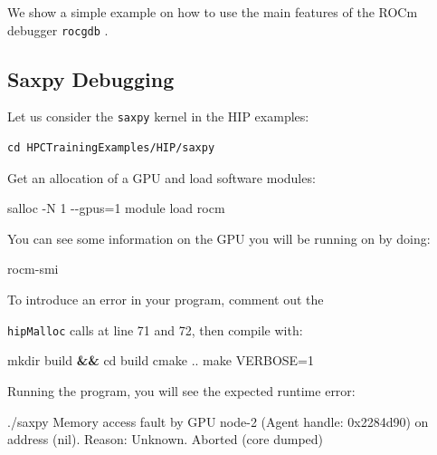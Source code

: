 \documentclass[
]{article}
\let\oldtexttt\texttt
\renewcommand{\texttt}[1]{
  \colorbox{Light}{\oldtexttt{#1}}
}
\newenvironment{Shaded}{}{}
\newcommand{\BuiltInTok}[1]{#1}
\newcommand{\ExtensionTok}[1]{#1}
\newcommand{\FunctionTok}[1]{\textcolor[rgb]{0.02,0.16,0.49}{#1}}
\newcommand{\KeywordTok}[1]{\textcolor[rgb]{0.00,0.44,0.13}{\textbf{#1}}}
\newcommand{\NormalTok}[1]{#1}
\begin{document}
We show a simple example on how to use the main features of the ROCm
debugger \texttt{rocgdb}.

\hypertarget{saxpy-debugging}{%
\subsection{Saxpy Debugging}\label{saxpy-debugging}}

Let us consider the \texttt{saxpy} kernel in the HIP examples:

\begin{verbatim}
cd HPCTrainingExamples/HIP/saxpy
\end{verbatim}

Get an allocation of a GPU and load software modules:

\begin{Shaded}
\begin{Highlighting}[]
\ExtensionTok{salloc}\NormalTok{ {-}N 1 {-}{-}gpus=1}
\ExtensionTok{module}\NormalTok{ load rocm}
\end{Highlighting}
\end{Shaded}

You can see some information on the GPU you will be running on by doing:

\begin{Shaded}
\begin{Highlighting}[]
\ExtensionTok{rocm{-}smi}
\end{Highlighting}
\end{Shaded}

To introduce an error in your program, comment out the
\texttt{hipMalloc} calls at line 71 and 72, then compile with:

\begin{Shaded}
\begin{Highlighting}[]
\FunctionTok{mkdir}\NormalTok{ build }\KeywordTok{\&\&} \BuiltInTok{cd}\NormalTok{ build}
\FunctionTok{cmake}\NormalTok{ ..}
\FunctionTok{make}\NormalTok{ VERBOSE=1}
\end{Highlighting}
\end{Shaded}

Running the program, you will see the expected runtime error:

\begin{Shaded}
\begin{Highlighting}[]
\ExtensionTok{./saxpy}
\ExtensionTok{Memory}\NormalTok{ access fault by GPU node{-}2 (Agent handle: 0x2284d90) }\ExtensionTok{on}\NormalTok{ address (nil)}\BuiltInTok{.} \ExtensionTok{Reason}\NormalTok{: Unknown.}
\ExtensionTok{Aborted}\NormalTok{ (core dumped)}
\end{Highlighting}
\end{Shaded}
\end{document}
